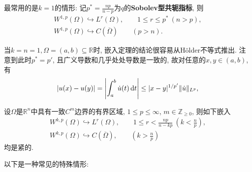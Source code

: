 最常用的是$k = 1$的情形: 记$p^* = \frac{np}{n - p}$为$q$的\textbf{Sobolev型共轭指标}, 则 
\begin{gather*}
    W^{1, p}(\Omega) \hookrightarrow L^r(\Omega), \qquad 1 \leq r \leq p^*\ (n > p), \\ 
    W^{1, p}(\Omega) \hookrightarrow C(\overline{\Omega}) \qquad (p > n).
\end{gather*}

\begin{remark}
    当$k = n = 1, \Omega = (a, b) \subseteq \mathbb{R}$时, 嵌入定理的结论很容易从H\"older不等式推出.
    注意到此时$p^* = p'$, 且广义导数和几乎处处导数是一致的, 故对任意的$x, y \in (a, b)$, 有 
    \begin{equation*}
        |u(x) - u(y)| = \left|\int_a^b\dot u(t) \,{\rm d}t\right| \leq |x - y|^{1/p'}\Vert \dot u \Vert_{L^p},
    \end{equation*}
\end{remark}

\begin{theorem}
    设$\Omega$是$\mathbb{R}^n$中具有一致$C^m$边界的有界区域, $1 \leq p \leq \infty$, $m \in \mathbb{Z}_{\geq 0}$, 则如下嵌入 
    \begin{gather*}
        W^{k, p}(\Omega) \hookrightarrow L^r(\Omega), \qquad 1 \leq r < \frac{np}{n - kp}\ \left(k < \frac{n}{p}\right), \\
        W^{k, p}(\Omega) \hookrightarrow C(\overline{\Omega}), \qquad \left(k > \frac{n}{p}\right)
    \end{gather*}
    均是紧的.
\end{theorem}

以下是一种常见的特殊情形:

